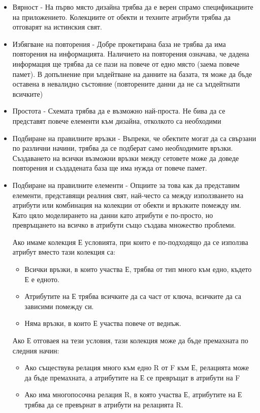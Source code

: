 \documentclass[fleqn,12pt]{article}
\begin{document}
\begin{itemize}
	\item Вярност - На първо място дизайна трябва да е верен спрамо спецификациите на приложението. Колекциите от обекти и техните атрибути трябва да отговарят на истинския свят.
	\item Избягване на повторения - Добре прокетирана база не трябва да има повторения на информацията. Наличието на повторения означава, че дадена информация ще трябва да се пази на повече от едно място (заема повече памет). В допълнение при ъпдейтване на данните на базата, тя може да бъде оставена в невалидно състояние (повторените данни да не са ъпдейтнати всичките)
	\item Простота - Схемата трябва да е възможно най-проста. Не бива да се представят повече елементи към дизайна, отколкото са необходими
	\item Подбиране на правилните връзки - Въпреки, че обектите могат да са свързани по различни начини, трябва да се подберат само необходимите връзки. Създаването на всички възможни връзки между сетовете може да доведе повторения и създадената база ще има нужда от повече памет.
	\item Подбиране на правилните елементи - Опциите за това как да представим елементи, представящи реалния свят, най-често са между използването на атрибути или комбинация на колекции от обекти и връзките помежду им. Като цяло моделирането на данни като атрибути е по-просто, но превръщането на всичко в атрибути също създава множество проблеми.
	
    Ако имаме колекция Е условията, при които е по-подходящо да се използва атрибут вместо тази колекция са:
	\begin{itemize}
        \item Всички връзки, в които участва Е, трябва от тип много към едно, където Е е едното. 
        \item Атрибутите на Е трябва всичките да са част от ключа, всичките да са зависими помежду си.
        \item Няма връзки, в които Е участва повече от веднъж.
    \end{itemize}

    Ако Е отговаея на тези условия, тази колекция може да бъде премахната по следния начин:
    \begin{itemize}
        \item Ако съществува релация много към едно R от F към Е, релацията може да бъде премахната, а атрибутите на Е се превръщат в атрибути на F
        \item Ако има многопосочна релация R, в която участва Е, атрибутите на Е трябва да се превърнат в атрибути на релацията R.
    \end{itemize}
\end{itemize}
\end{document}
